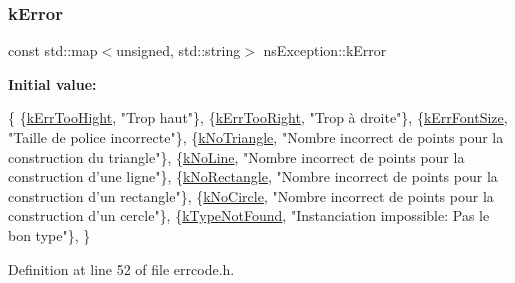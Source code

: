 \subsubsection{\texorpdfstring{k\+Error}{kError}}
{\footnotesize\ttfamily const std\+::map$<$unsigned, std\+::string$>$ ns\+Exception\+::k\+Error}

{\bfseries Initial value\+:}
\begin{DoxyCode}
\{
    \{\hyperlink{namespacens_exception_ae4cd0d6bbd5590a1b121347632d41376a123e9c1829e779b75c070e9c8fdb188f}{kErrTooHight}, \textcolor{stringliteral}{"Trop haut"}\},
    \{\hyperlink{namespacens_exception_ae4cd0d6bbd5590a1b121347632d41376aff4f15361ad4d1b254751071ad21e3e6}{kErrTooRight}, \textcolor{stringliteral}{"Trop à droite"}\},
    \{\hyperlink{namespacens_exception_ae4cd0d6bbd5590a1b121347632d41376a526faf634cffcb857a4b99b82a0f4d03}{kErrFontSize}, \textcolor{stringliteral}{"Taille de police incorrecte"}\},
    \{\hyperlink{namespacens_exception_ae4cd0d6bbd5590a1b121347632d41376a4117018a026c58336132da21ff52b840}{kNoTriangle}, \textcolor{stringliteral}{"Nombre incorrect de points pour la construction du triangle"}\},
    \{\hyperlink{namespacens_exception_ae4cd0d6bbd5590a1b121347632d41376a35eb9a961a3b4627ee0801912e781e2e}{kNoLine}, \textcolor{stringliteral}{"Nombre incorrect de points pour la construction d'une ligne"}\},
    \{\hyperlink{namespacens_exception_ae4cd0d6bbd5590a1b121347632d41376a8f9b0ec84f1fdf7b138e9a9039ef31e5}{kNoRectangle}, \textcolor{stringliteral}{"Nombre incorrect de points pour la construction d'un rectangle"}\},
    \{\hyperlink{namespacens_exception_ae4cd0d6bbd5590a1b121347632d41376a83bc80fd1df49b7c72bede3cfdf0220e}{kNoCircle}, \textcolor{stringliteral}{"Nombre incorrect de points pour la construction d'un cercle"}\},
    \{\hyperlink{namespacens_exception_ae4cd0d6bbd5590a1b121347632d41376aaebf556f9516d8fa517d75821ff43073}{kTypeNotFound}, \textcolor{stringliteral}{"Instanciation impossible: Pas le bon type"}\},
\}
\end{DoxyCode}


Definition at line 52 of file errcode.\+h.

